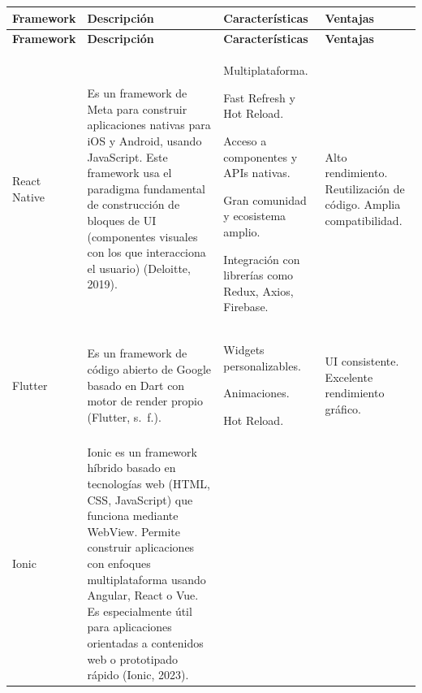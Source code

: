 

{\small
\begin{longtable}{|L{2.2cm}|L{5.55cm}|L{3.8cm}|L{2.7cm}|}
\hline
{} \textbf{Framework} & \textbf{Descripción} & \textbf{Características} &
\textbf{Ventajas} \\
\hline
\endfirsthead
\hline
{} \textbf{Framework} & \textbf{Descripción} & \textbf{Características} &
\textbf{Ventajas} \\
\hline
\endhead

\endfoot
React Native & Es un framework de Meta para construir aplicaciones nativas
para iOS y Android, usando JavaScript. Este framework usa el paradigma
fundamental de construcción de bloques de UI (componentes visuales con los que
interacciona el usuario) (Deloitte, 2019). &
\begin{tablista}
  \item Multiplataforma.
  \item Fast Refresh y Hot Reload.
  \item Acceso a componentes y APIs nativas.
  \item Gran comunidad y ecosistema amplio.
  \item Integración con librerías como Redux, Axios, Firebase.
\end{tablista} &
Alto rendimiento. Reutilización de código. Amplia compatibilidad. \\
\hline
Flutter & Es un framework de código abierto de Google basado en Dart con motor
de render propio (Flutter, s.~f.). &
\begin{tablista}
  \item Widgets personalizables.
  \item Animaciones.
  \item Hot Reload.
\end{tablista} &
UI consistente. Excelente rendimiento gráfico. \\
\hline
Ionic & Ionic es un framework híbrido basado en tecnologías web (HTML, CSS,
JavaScript) que funciona mediante WebView. Permite construir aplicaciones con
enfoques multiplataforma usando Angular, React o Vue. Es especialmente útil
para aplicaciones orientadas a contenidos web o prototipado rápido (Ionic, 2023). &

\end{longtable}}
